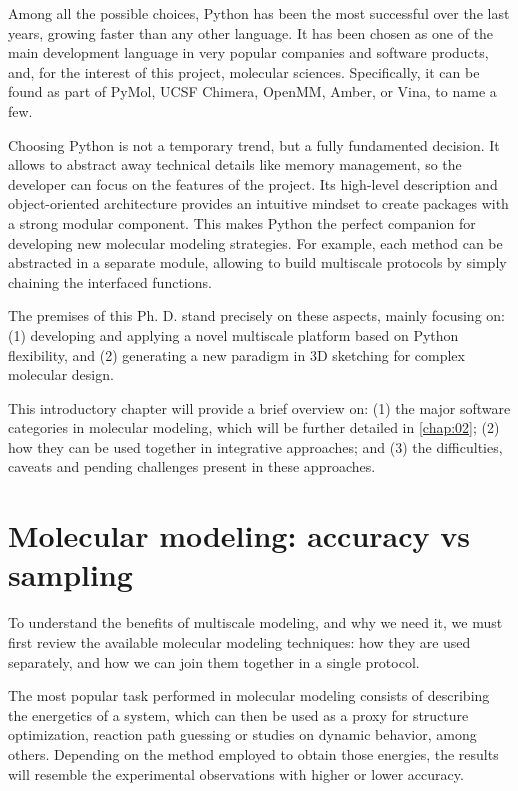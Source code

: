 Among all the possible choices, Python has been the most successful over the last years, growing faster than any other language.\cite{stackoverflowpythongrowth} It has been chosen as one of the main development language in very popular companies and software products,\cite{pythonsuccess,googlepython,facebookpython,netflixpython} and, for the interest of this project, molecular sciences. Specifically, it can be found as part of PyMol,\cite{pymol} UCSF Chimera,\cite{chimera} OpenMM,\cite{openmm} Amber,\cite{amber} or Vina,\cite{trott2010autodock} to name a few.

Choosing Python is not a temporary trend, but a fully fundamented decision. It allows to abstract away technical details like memory management, so the developer can focus on the features of the project. Its high-level description and object-oriented architecture provides an intuitive mindset to create packages with a strong modular component. This makes Python the perfect companion for developing new molecular modeling strategies. For example, each method can be abstracted in a separate module, allowing to build multiscale protocols by simply chaining the interfaced functions.

The premises of this Ph. D. stand precisely on these aspects, mainly focusing on: (1) developing and applying a novel multiscale platform based on Python flexibility, and (2) generating a new paradigm in 3D sketching for complex molecular design.

This introductory chapter will provide a brief overview on: (1) the major software categories in molecular modeling, which will be further detailed in \autoref{chap:02}; (2) how they can be used together in integrative approaches; and (3) the difficulties, caveats and pending challenges present in these approaches.

\section{Molecular modeling: accuracy vs sampling}

To understand the benefits of multiscale modeling, and why we need it, we must first review the available molecular modeling techniques: how they are used separately, and how we can join them together in a single protocol.

The most popular task performed in molecular modeling consists of describing the energetics of a system, which can then be used as a proxy for structure optimization, reaction path guessing or studies on dynamic behavior, among others. Depending on the method employed to obtain those energies, the results will resemble the experimental observations with higher or lower accuracy.

